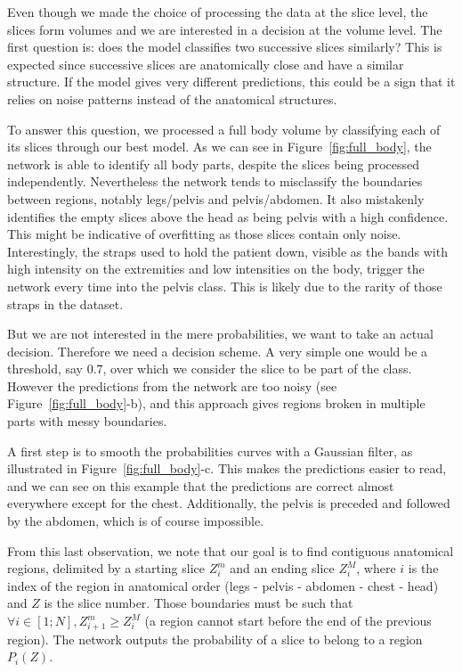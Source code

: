 Even though we made the choice of processing the data at the slice level, the slices form volumes and we are interested in a decision at the volume level. The first question is: does the model classifies two successive slices similarly? This is expected since successive slices are anatomically close and have a similar structure. If the model gives very different predictions, this could be a sign that it relies on noise patterns instead of the anatomical structures.

To answer this question, we processed a full body volume by classifying each of its slices through our best model. 
As we can see in Figure~\ref{fig:full_body}, the network is able to identify all body parts, despite the slices being processed independently. Nevertheless the network tends to misclassify the boundaries between regions, notably legs/pelvis and pelvis/abdomen. It also mistakenly identifies the empty slices above the head as being pelvis with a high confidence. This might be indicative of overfitting as those slices contain only noise. Interestingly, the straps used to hold the patient down, visible as the bands with high intensity on the extremities and low intensities on the body, trigger the network every time into the pelvis class. This is likely due to the rarity of those straps in the dataset.

But we are not interested in the mere probabilities, we want to take an actual decision. Therefore we need a decision scheme. A very simple one would be a threshold, say $0.7$, over which we consider the slice to be part of the class. However the predictions from the network are too noisy (see Figure~\ref{fig:full_body}-b), and this approach gives regions broken in multiple parts with messy boundaries.

A first step is to smooth the probabilities curves with a Gaussian filter, as illustrated in Figure~\ref{fig:full_body}-c. This makes the predictions easier to read, and we can see on this example that the predictions are correct almost everywhere except for the chest. Additionally, the pelvis is preceded and followed by the abdomen, which is of course impossible.

From this last observation, we note that our goal is to find contiguous anatomical regions, delimited by a starting slice $Z^m_i$ and an ending slice $Z^M_i$, where $i$ is the index of the region in anatomical order (legs - pelvis - abdomen - chest - head) and $Z$ is the slice number. Those boundaries must be such that 
$\forall i \in [1; N], Z^m_{i+1} \ge Z^M_i$ (a region cannot start before the end of the previous region). The network outputs the probability of a slice to belong to a region $P_i \left( Z \right)$.

